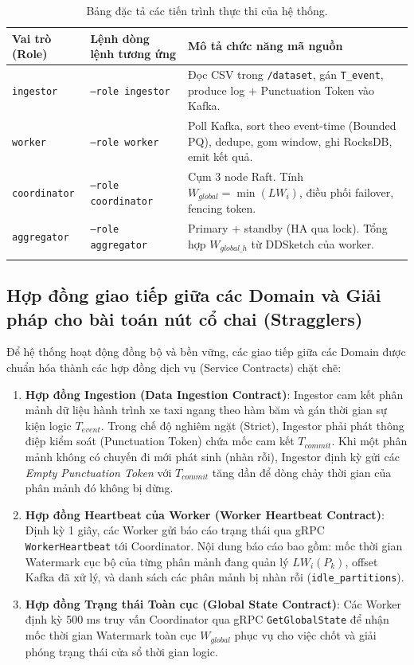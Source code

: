 \documentclass[12pt,a4paper]{article}
\begin{document}
\begin{longtable}{p{} p{} p{}}
\toprule
\textbf{Vai trò (Role)} & \textbf{Lệnh dòng lệnh tương ứng} & \textbf{Mô tả chức năng mã nguồn} \\
\midrule
\endhead
\texttt{ingestor} & \texttt{--role ingestor} & Đọc CSV trong \texttt{/dataset}, gán \texttt{T\_event}, produce log + Punctuation Token vào Kafka. \\
\texttt{worker} & \texttt{--role worker} & Poll Kafka, sort theo event-time (Bounded PQ), dedupe, gom window, ghi RocksDB, emit kết quả. \\
\texttt{coordinator} & \texttt{--role coordinator} & Cụm 3 node Raft. Tính $W_{global} = \min(LW_i)$, điều phối failover, fencing token. \\
\texttt{aggregator} & \texttt{--role aggregator} & Primary + standby (HA qua lock). Tổng hợp $W_{global\_h}$ từ DDSketch của worker. \\
\bottomrule
\caption{Bảng đặc tả các tiến trình thực thi của hệ thống.}
\end{longtable}

\subsection{Hợp đồng giao tiếp giữa các Domain và Giải pháp cho bài toán nút cổ chai (Stragglers)}

Để hệ thống hoạt động đồng bộ và bền vững, các giao tiếp giữa các Domain được chuẩn hóa thành các hợp đồng dịch vụ (Service Contracts) chặt chẽ:
\begin{enumerate}
    \item \textbf{Hợp đồng Ingestion (Data Ingestion Contract)}: Ingestor cam kết phân mảnh dữ liệu hành trình xe taxi ngang theo hàm băm và gán thời gian sự kiện logic $T_{event}$. Trong chế độ nghiêm ngặt (Strict), Ingestor phải phát thông điệp kiểm soát (Punctuation Token) chứa mốc cam kết $T_{commit}$. Khi một phân mảnh không có chuyến đi mới phát sinh (nhàn rỗi), Ingestor định kỳ gửi các \textit{Empty Punctuation Token} với $T_{commit}$ tăng dần để dòng chảy thời gian của phân mảnh đó không bị dừng.
    \item \textbf{Hợp đồng Heartbeat của Worker (Worker Heartbeat Contract)}: Định kỳ 1 giây, các Worker gửi báo cáo trạng thái qua gRPC \texttt{WorkerHeartbeat} tới Coordinator. Nội dung báo cáo bao gồm: mốc thời gian Watermark cục bộ của từng phân mảnh đang quản lý $LW_i(P_k)$, offset Kafka đã xử lý, và danh sách các phân mảnh bị nhàn rỗi (\texttt{idle\_partitions}).
    \item \textbf{Hợp đồng Trạng thái Toàn cục (Global State Contract)}: Các Worker định kỳ 500 ms truy vấn Coordinator qua gRPC \texttt{GetGlobalState} để nhận mốc thời gian Watermark toàn cục $W_{global}$ phục vụ cho việc chốt và giải phóng trạng thái cửa sổ thời gian logic.
\end{enumerate}
\end{document}
